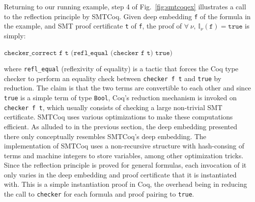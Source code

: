 \documentclass{article}
\begin{document}
	Returning to our running example, 
	step 4 of 
	Fig.~\ref{fig:smtcoqex} illustrates
	a call to the reflection principle by
	SMTCoq. Given 
	deep embedding \texttt{f}
	of the formula in the example, and 
	SMT proof certificate \texttt{t} of 
	\texttt{f}, the proof of $\forall\ \nu,\ 
	\mathbb{I}_{\nu}(\texttt{f}) = 
	\texttt{true}$ is simply:
	\begin{center}
		$\texttt{checker\_correct f t
			(refl\_equal (checker f t) true)}$
	\end{center}
	where \texttt{refl\_equal} 
	(reflexivity of equality) is a tactic
	that forces the Coq type checker to 
	perform an equality check between 
	\texttt{checker f t} and 
	\texttt{true} by reduction. 
	The claim is that the two 
	terms are convertible to each other
	and since \texttt{true} is a simple 
	term of type \texttt{Bool}, 
	Coq's reduction mechanism is 
	invoked on \texttt{checker f t},
	which usually consists of checking
	a large non-trivial SMT certificate. 
	SMTCoq uses various optimizations 
	to make these computations efficient.
	As alluded to in the previous section,
	the deep embedding presented there 
	only conceptually resembles SMTCoq's
	deep embedding. The implementation 
	of SMTCoq uses a non-recursive 
	structure with hash-consing of terms
	and machine integers to store variables,
	among other optimization tricks.
	Since the reflection principle is 
	proved for general formulas, 
	each invocation of it only varies
	in the deep embedding and proof 
	certificate that it is instantiated
	with. This is a simple instantiation
	proof in Coq, the overhead
	being in reducing the call to 
	\texttt{checker} for each 
	formula and proof pairing to 
	\texttt{true}.
	
\end{document}
